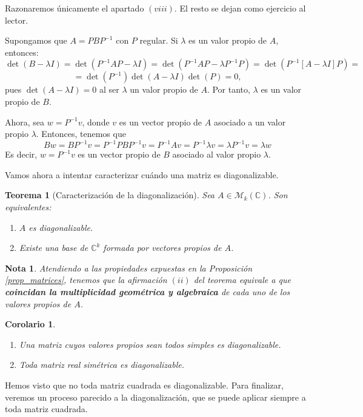 \documentclass[11pt, a4paper]{article}
\makeatletter
\newif\IfInSansMode
\let\oldsf\sffamily
\renewcommand*{\sffamily}{\oldsf\mathversion{sans}\InSansModetrue}
\let\oldnorm\normalfont
\renewcommand*{\normalfont}{\oldnorm\InSansModefalse\mathversion{normal}}
\renewenvironment{proof}[1][\proofname] {\vspace{-15pt}\par\pushQED{\qed}\normalfont\topsep6\p@\@plus6\p@\relax\trivlist\item[\hskip\labelsep\it#1\@addpunct{.}]\ignorespaces}{\popQED\endtrivlist\@endpefalse}
\numberwithin{equation}{section}
\newcommand{\la}{\lambda}
\renewenvironment{proof}[1][\proofname] {\par\pushQED{\qed}\normalfont\topsep6\p@\@plus6\p@\relax\trivlist\item[\hskip\labelsep\itshape\sffamily#1\@addpunct{.}]\ignorespaces}{\popQED\endtrivlist\@endpefalse}
\theoremstyle{theorem-style}
\newtheorem{nth}{Teorema}[section]
\newtheorem{ncor}{Corolario}[section]
\theoremstyle{definition-style}
\theoremstyle{remark-style}
\newtheorem*{nota}{Nota}
\theoremstyle{example-style}
\newenvironment{nlist}
{\begin{enumerate}
    \renewcommand\labelenumi{(\emph{\roman{enumi})}}}
  {\end{enumerate}}
\makeatother
\begin{document}
\begin{proof} Razonaremos únicamente el apartado $(viii)$. El resto se dejan como ejercicio al lector.

Supongamos que $A=PBP^{-1}$ con $P$ regular. Si $\lambda$ es un valor propio de $A$, entonces: $$\det(B - \la I) =  \det(P^{-1}AP - \lambda I) = \det(P^{-1}AP - \lambda P^{-1}P) = \det(P^{-1}[A - \la I]P) =$$ $$=\det(P^{-1}) \det(A - \lambda I) \det(P) = 0, $$
pues $\det(A - \la I) = 0$ al ser $\lambda$ un valor propio de $A$. Por tanto, $\lambda$ es un valor propio de $B$.

Ahora, sea $w = P^{-1}v$, donde $v$ es un vector propio de $A$ asociado a un valor propio $\la$. Entonces, tenemos que $$Bw = BP^{-1}v = P^{-1}PBP^{-1}v = P^{-1}Av = P^{-1}\la v = \la P^{-1}v = \la w$$ Es decir, $w = P^{-1}v$ es un vector propio de $B$ asociado al valor propio $\la$.
\end{proof}

Vamos ahora a intentar caracterizar cuándo una matriz es diagonalizable.

\begin{nth}[Caracterización de la diagonalización]
  Sea $A \in \mathcal M_k(\mathbb C)$. Son equivalentes:
  \begin{nlist}
  \item $A$ es diagonalizable.
  \item Existe una base de $\mathbb C^k$ formada por vectores propios de $A$.
  \end{nlist}
\end{nth}

\begin{nota}
	Atendiendo a las propiedades expuestas en la \textit{Proposición \ref{prop_matrices}}, tenemos que la afirmación $(ii)$ del teorema equivale a que \textbf{coincidan la multiplicidad geométrica y algebraica} de cada uno de los valores propios de $A$.
\end{nota}

\begin{ncor} \hfill
  \begin{nlist}
  \item Una matriz cuyos valores propios sean todos simples es diagonalizable.
  \item Toda matriz real simétrica es diagonalizable.
  \end{nlist}
\end{ncor}

Hemos visto que no toda matriz cuadrada es diagonalizable. Para finalizar, veremos un proceso parecido a la diagonalización, que se puede aplicar siempre a toda matriz cuadrada.
\end{document}
